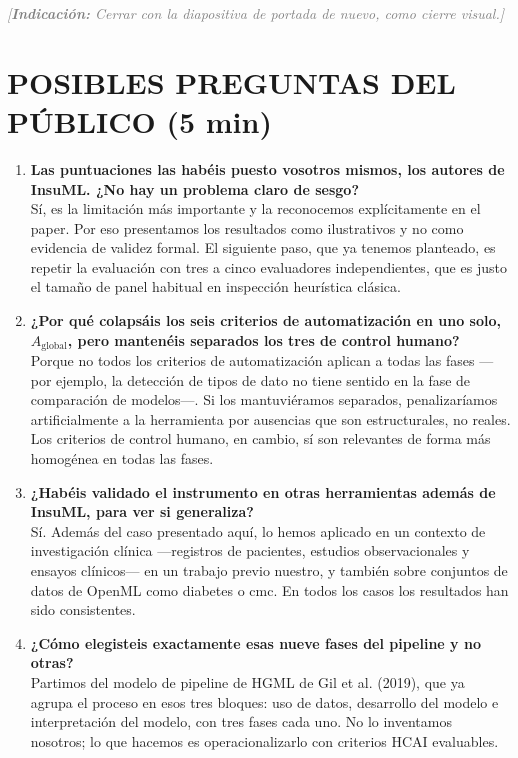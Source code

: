 \documentclass[11pt,a4paper]{article}
\newcommand{\indicacion}[1]{%
    \par\medskip
    \noindent\textcolor{gray}{\textit{[\textbf{Indicaci\'on:} #1]}}
    \par\medskip
}
\begin{document}
\indicacion{Cerrar con la diapositiva de portada de nuevo, como cierre visual.}

\newpage
\section*{POSIBLES PREGUNTAS DEL PÚBLICO \hfill \normalfont\small (5 min)}

\begin{enumerate}[leftmargin=*]

\item \textbf{Las puntuaciones las habéis puesto vosotros mismos, los autores de InsuML. ¿No hay un problema claro de sesgo?}\\
Sí, es la limitación más importante y la reconocemos explícitamente en el paper. Por eso presentamos los resultados como ilustrativos y no como evidencia de validez formal. El siguiente paso, que ya tenemos planteado, es repetir la evaluación con tres a cinco evaluadores independientes, que es justo el tamaño de panel habitual en inspección heurística clásica.

\item \textbf{¿Por qué colapsáis los seis criterios de automatización en uno solo, $A_{\text{global}}$, pero mantenéis separados los tres de control humano?}\\
Porque no todos los criterios de automatización aplican a todas las fases —por ejemplo, la detección de tipos de dato no tiene sentido en la fase de comparación de modelos—. Si los mantuviéramos separados, penalizaríamos artificialmente a la herramienta por ausencias que son estructurales, no reales. Los criterios de control humano, en cambio, sí son relevantes de forma más homogénea en todas las fases.

\item \textbf{¿Habéis validado el instrumento en otras herramientas además de InsuML, para ver si generaliza?}\\
Sí. Además del caso presentado aquí, lo hemos aplicado en un contexto de investigación clínica —registros de pacientes, estudios observacionales y ensayos clínicos— en un trabajo previo nuestro, y también sobre conjuntos de datos de OpenML como diabetes o cmc. En todos los casos los resultados han sido consistentes.

\item \textbf{¿Cómo elegisteis exactamente esas nueve fases del pipeline y no otras?}\\
Partimos del modelo de pipeline de HGML de Gil et al. (2019), que ya agrupa el proceso en esos tres bloques: uso de datos, desarrollo del modelo e interpretación del modelo, con tres fases cada uno. No lo inventamos nosotros; lo que hacemos es operacionalizarlo con criterios HCAI evaluables.


\end{enumerate}
\end{document}
